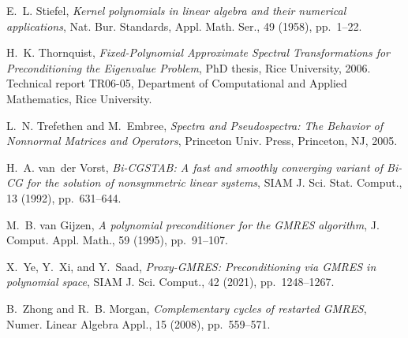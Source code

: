 \documentclass{siamart}
\begin{document}
\begin{thebibliography}{10}
{\sc E.~L. Stiefel}, {\em Kernel polynomials in linear algebra and their
  numerical applications}, Nat. Bur. Standards, Appl. Math. Ser., 49 (1958),
  pp.~1--22.

{\sc H.~K. Thornquist}, {\em Fixed-Polynomial Approximate Spectral
  Transformations for Preconditioning the Eigenvalue Problem}, PhD thesis, Rice
  University, 2006.
\newblock Technical report TR06-05, Department of Computational and Applied
  Mathematics, Rice University.

{\sc L.~N. Trefethen and M.~Embree}, {\em Spectra and Pseudospectra: The
  Behavior of Nonnormal Matrices and Operators}, Princeton Univ. Press,
  Princeton, NJ, 2005.

{\sc H.~A. van~der Vorst}, {\em {B}i-{CGSTAB}: A fast and smoothly converging
  variant of {B}i-{CG} for the solution of nonsymmetric linear systems}, SIAM
  J. Sci. Stat. Comput., 13 (1992), pp.~631--644.

{\sc M.~B. van Gijzen}, {\em A polynomial preconditioner for the {GMRES}
  algorithm}, J. Comput. Appl. Math., 59 (1995), pp.~91--107.

{\sc X.~Ye, Y.~Xi, and Y.~Saad}, {\em Proxy-{GMRES}: Preconditioning via
  {GMRES} in polynomial space}, SIAM J. Sci. Comput., 42 (2021),
  pp.~1248--1267.

{\sc B.~Zhong and R.~B. Morgan}, {\em Complementary cycles of restarted
  {GMRES}}, Numer. Linear Algebra Appl., 15 (2008), pp.~559--571.

\end{thebibliography}
\end{document}
